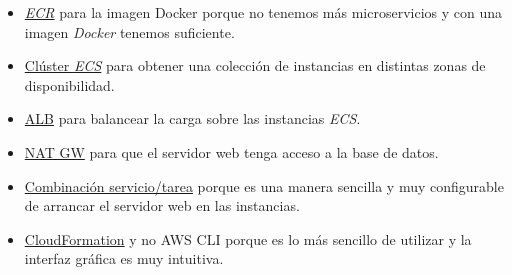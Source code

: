 \begin{itemize}
    \item \underline{\textit{ECR}} para la imagen Docker porque no tenemos más microservicios y con una imagen \textit{Docker} tenemos suficiente.

    \item \underline{Clúster \textit{ECS}} para obtener una colección de instancias en distintas zonas de disponibilidad.

    \item \underline{ALB} para balancear la carga sobre las instancias \textit{ECS}.

    \item \underline{NAT GW} para que el servidor web tenga acceso a la base de datos.

    \item \underline{Combinación servicio/tarea} porque es una manera sencilla y muy configurable de arrancar el servidor web en las instancias.

    \item \underline{CloudFormation} y no AWS CLI porque es lo más sencillo de utilizar y la interfaz gráfica es muy intuitiva.
\end{itemize}
